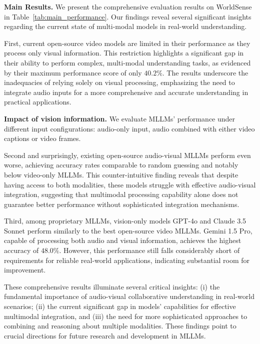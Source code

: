 \textbf{Main Results.} 
We present the comprehensive evaluation results on WorldSense in Table~\ref{tab:main_performance}. Our findings reveal several significant insights regarding the current state of multi-modal models in real-world understanding.



First, current open-source video models are limited in their performance as they process only visual information. This restriction highlights a significant gap in their ability to perform complex, multi-modal understanding tasks, as evidenced by their maximum performance score of only $40.2\%$. The results underscore the inadequacies of relying solely on visual processing, emphasizing the need to integrate audio inputs for a more comprehensive and accurate understanding in practical applications. 

\begin{table*}[htbp]
  \caption{\textbf{Impact of vision information.} We evaluate MLLMs’ performance under different input configurations: audio-only input, audio combined with either video captions or video frames. }
  \label{tab:ablation_vision}
  \centering
  \begin{adjustbox}{width=\textwidth}
    
  \end{adjustbox}
  \vspace{-6mm}
\end{table*}

Second and surprisingly, existing open-source audio-visual MLLMs perform even worse, achieving accuracy rates comparable to random guessing and notably below video-only MLLMs. This counter-intuitive finding reveals that despite having access to both modalities, these models struggle with effective audio-visual integration, suggesting that multimodal processing capability alone does not guarantee better performance without sophisticated integration mechanisms.


Third, among proprietary MLLMs, vision-only models GPT-4o and Claude 3.5 Sonnet perform similarly to the best open-source video MLLMs. Gemini 1.5 Pro, capable of processing both audio and visual information, achieves the highest accuracy of $48.0\%$. However, this performance still falls considerably short of requirements for reliable real-world applications, indicating substantial room for improvement.


These comprehensive results illuminate several critical insights: 
(i) the fundamental importance of audio-visual collaborative understanding in real-world scenarios; (ii) the current significant gap in models' capabilities for effective multimodal integration, and (iii) the need for more sophisticated approaches to combining and reasoning about multiple modalities. These findings point to crucial directions for future research and development in MLLMs.



